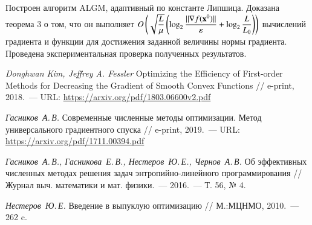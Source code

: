 \documentclass{crm-article}
\begin{document}
Построен алгоритм ALGM, адаптивный по константе Липшица. Доказана теорема 3 о том, что он выполняет $O\left(\sqrt{\dfrac{L}{\mu}}\left(\log_2\dfrac{||\nabla f({\bf x}^0)||}{\varepsilon}+\log_2\dfrac{L}{L_0}\right)\right)$ вычислений градиента и функции для достижения заданной величины нормы градиента. Проведена экспериментальная проверка полученных результатов.




\begin{thebibliography}{99}

	\textit{Donghwan Kim, Jeffrey A. Fessler} Optimizing the Efficiency of First-order Methods for Decreasing the Gradient of Smooth Convex Functions // e-print, 2018.~--- URL: \url{https://arxiv.org/pdf/1803.06600v2.pdf}

	\textit{Гасников~А.\,В. } Современные численные методы оптимизации.
	Метод универсального градиентного спуска // e-print, 2019.~--- URL: \url{https://arxiv.org/pdf/1711.00394.pdf}


  \textit{Гасников~А.\,В., Гасникова~Е.\,В., Нестеров~Ю.\,Е., Чернов~А.\,В.} Об эффективных численных методах решения задач энтропийно-линейного программирования  // Журнал выч. математики и мат. физики.~--- 2016.~--- Т. 56, № 4.


	\textit{Нестеров~Ю.\,Е.}
    Введение в выпуклую оптимизацию // М.:МЦНМО, 2010.~--- 262 c.


\end{thebibliography}
\end{document}
